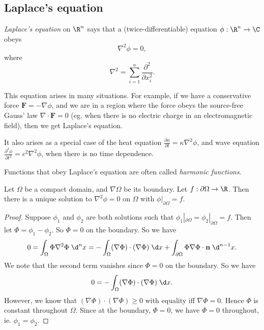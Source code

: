 \documentclass[a4paper]{article}
\begin{document}
\subsection{Laplace's equation}
\begin{defi}
  \emph{Laplace's equation} on $\R^n$ says that a (twice-differentiable) equation $\phi: \R^n \to \C$ obeys
  \[
    \nabla^2 \phi = 0,
  \]
  where
  \[
    \nabla^2 = \sum_{i = 1}^n \frac{\partial^2}{\partial x_i^2}.
  \]
\end{defi}
This equation arises in many situations. For example, if we have a conservative force $\mathbf{F} = -\nabla \phi$, and we are in a region where the force obeys the source-free Gauss' law $\nabla\cdot \mathbf{F} = 0$ (eg. when there is no electric charge in an electromagnetic field), then we get Laplace's equation.

It also arises as a special case of the heat equation $\frac{\partial \phi}{\partial t} = \kappa \nabla^2 \phi$, and wave equation $\frac{\partial^2 \phi}{\partial t^2} = c^2 \nabla^2 \phi$, when there is no time dependence.

\begin{defi}
  Functions that obey Laplace's equation are often called \emph{harmonic functions}.
\end{defi}

\begin{prop}
  Let $\Omega$ be a compact domain, and $\nabla \Omega$ be its boundary. Let $ f: \partial \Omega\to \R$. Then there is a unique solution to $\nabla^2 \phi = 0$ on $\Omega$ with $\phi|_{\partial \Omega} = f$.
\end{prop}

\begin{proof}
  Suppose $\phi_1$ and $\phi_2$ are both solutions such that $\phi_1|_{\partial \Omega} = \phi_2|_{\partial \Omega} = f$. Then let $\Phi = \phi_1 - \phi_2$. So $\Phi = 0$ on the boundary. So we have
  \[
    0 = \int_\Omega \Phi \nabla^2 \Phi \;\d^n x  = -\int_\Omega (\nabla \Phi) \cdot (\nabla \Phi)\;\d x + \int_{\partial \Omega} \Phi \nabla \Phi\cdot \mathbf{n} \;\d^{n -1 }x.
  \]
  We note that the second term vanishes since $\Phi = 0$ on the boundary. So we have
  \[
    0 = -\int_\Omega (\nabla \Phi) \cdot (\nabla \Phi)\;\d x.
  \]
  However, we know that $(\nabla \Phi) \cdot (\nabla \Phi) \geq 0$ with equality iff $\nabla \Phi = 0$.  Hence $\Phi$ is constant throughout $\Omega$. Since at the boundary, $\Phi = 0$, we have $\Phi = 0$ throughout, ie. $\phi_1 = \phi_2$.
\end{proof}
\end{document}
